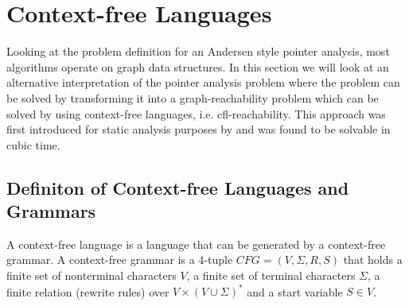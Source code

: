 \section{Context-free Languages}
Looking at the problem definition for an Andersen style pointer analysis, most algorithms operate on graph data structures.
In this section we will look at an alternative interpretation of the pointer analysis problem where the problem can be solved by transforming it into a graph-reachability problem which can be solved by using context-free languages, i.e. cfl-reachability.
This approach was first introduced for static analysis purposes by \cite{reps1998program} and was found to be solvable in cubic time.

\subsection{Definiton of Context-free Languages and Grammars}
A context-free language is a language that can be generated by a context-free grammar.
A context-free grammar is a 4-tuple $CFG=(V,\Sigma,R,S)$ that holds a finite set of nonterminal characters $V$, a finite set of terminal characters $\Sigma$, a finite relation (rewrite rules) over $V\times (V \cup \Sigma)^*$ and a start variable $S \in V$.

